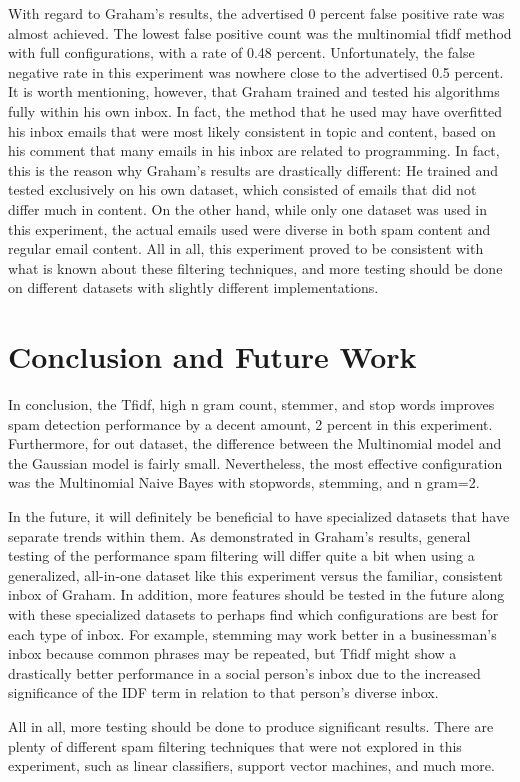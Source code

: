 \documentclass{article}
\begin{document}
\begin{paragraph}
With regard to Graham's results, the advertised 0 percent false positive rate was almost achieved. The lowest false positive count was the multinomial tfidf method with full configurations, with a rate of 0.48 percent. Unfortunately, the false negative rate in this experiment was nowhere close to the advertised 0.5 percent. It is worth mentioning, however, that Graham trained and tested his algorithms fully within his own inbox. In fact, the method that he used may have overfitted his inbox emails that were most likely consistent in topic and content, based on his comment that many emails in his inbox are related to programming. In fact, this is the reason why Graham's results are drastically different: He trained and tested exclusively on his own dataset, which consisted of emails that did not differ much in content. On the other hand, while only one dataset was used in this experiment, the actual emails used were diverse in both spam content and regular email content. All in all, this experiment proved to be consistent with what is known about these filtering techniques, and more testing should be done on different datasets with slightly different implementations.
\cite{a_plan_for_spam}
\end{paragraph}

\section{Conclusion and Future Work}
\begin{paragraph}
In conclusion, the Tfidf, high n gram count, stemmer, and stop words improves spam detection performance by a decent amount, 2 percent in this experiment. Furthermore, for out dataset, the difference between the Multinomial model and the Gaussian model is fairly small. Nevertheless, the most effective configuration was the Multinomial Naive Bayes with stopwords, stemming, and n gram=2.
\end{paragraph}
\begin{paragraph}
In the future, it will definitely be beneficial to have specialized datasets that have separate trends within them. As demonstrated in Graham's results, general testing of the performance spam filtering will differ quite a bit when using a generalized, all-in-one dataset like this experiment versus the familiar, consistent inbox of Graham. In addition, more features should be tested in the future along with these specialized datasets to perhaps find which configurations are best for each type of inbox. For example, stemming may work better in a businessman's inbox because common phrases may be repeated, but Tfidf might show a drastically better performance in a social person's inbox due to the increased significance of the IDF term in relation to that person's diverse inbox.
\end{paragraph}
\begin{paragraph}
All in all, more testing should be done to produce significant results. There are plenty of different spam filtering techniques that were not explored in this experiment, such as linear classifiers, support vector machines, and much more.
\end{paragraph}




\end{document}
